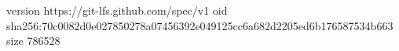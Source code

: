 version https://git-lfs.github.com/spec/v1
oid sha256:70c0082d0e027850278a07456392e049125cc6a682d2205ed6b176587534b663
size 786528

